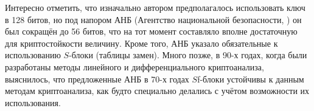 Интересно отметить, что изначально автором предполагалось использовать ключ в 128 битов, но под напором АНБ (Агентство национальной безопасности, ) он был сокращён до 56 битов, что на тот момент составляло вполне достаточную для криптостойкости величину. Кроме того, АНБ указало обязательные к использованию $S$-блоки (таблицы замен). Много позже, в 90-х годах, когда были разработаны методы линейного и дифференциального криптоанализа, выяснилось, что предложенные АНБ в 70-х годах $S$f-блоки устойчивы к данным методам криптоанализа, как будто специально делались с учётом возможности их использования.

